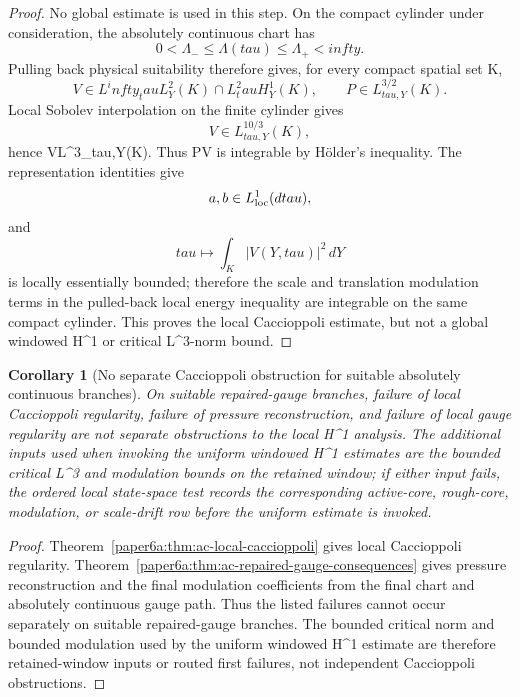 \documentclass[11pt]{amsart}
\def\({}%
\def\){}%
\def\tau{tau}%
\def\infty{infty}%
\theoremstyle{plain}
\newtheorem{corollary}[corollary]{Corollary}
\theoremstyle{definition}
\theoremstyle{remark}
\begin{document}
\begin{proof}
No global estimate is used in this step.  On the compact cylinder under
consideration, the absolutely continuous chart has
\[
  0<\Lambda_-\leq \Lambda(\tau)\leq \Lambda_+<\infty.
\]
Pulling back physical suitability therefore gives, for every compact spatial
set \(K\),
\[
  V\in L^\infty_\tau L^2_Y(K)\cap L^2_\tau H^1_Y(K),
  \qquad
  P\in L^{3/2}_{\tau,Y}(K).
\]
Local Sobolev interpolation on the finite cylinder gives
\[
  V\in L^{10/3}_{\tau,Y}(K),
\]
hence \(V\in L^3_{\tau,Y}(K)\).  Thus \(PV\cdot\nabla\phi\) is integrable by
Hölder's inequality.  The representation identities give
\[
  a,b\in L^1_{\rm loc}(d\tau),
\]
and
\[
  \tau\mapsto\int_K |V(Y,\tau)|^2\,dY
\]
is locally essentially bounded; therefore the scale and translation modulation
terms in the pulled-back local energy inequality are integrable on the same
compact cylinder.  This proves the local Caccioppoli estimate, but not a
global windowed \(H^1\) or critical \(L^3\)-norm bound.
\end{proof}

\begin{corollary}[No separate Caccioppoli obstruction for suitable absolutely continuous branches]
\label{paper6a:cor:no-independent-caccioppoli-obstruction-ac-suitable}
On suitable repaired-gauge branches, failure of local Caccioppoli regularity,
failure of pressure reconstruction, and failure of local gauge regularity are
not separate obstructions to the local \(H^1\) analysis.  The additional inputs
used when invoking the uniform windowed \(H^1\) estimates are the bounded
critical \(L^3\) and modulation bounds on the retained window; if either input
fails, the ordered local state-space test records the corresponding active-core,
rough-core, modulation, or scale-drift row before the uniform estimate is
invoked.
\end{corollary}

\begin{proof}
Theorem~\ref{paper6a:thm:ac-local-caccioppoli} gives local Caccioppoli
regularity.  Theorem~\ref{paper6a:thm:ac-repaired-gauge-consequences} gives
pressure reconstruction and the final modulation coefficients from the
final chart and absolutely continuous gauge path.  Thus the listed
failures cannot occur separately on suitable repaired-gauge branches.  The
bounded critical norm and bounded modulation used by the uniform windowed
\(H^1\) estimate are therefore retained-window inputs or routed first failures,
not independent Caccioppoli obstructions.
\end{proof}
\end{document}
